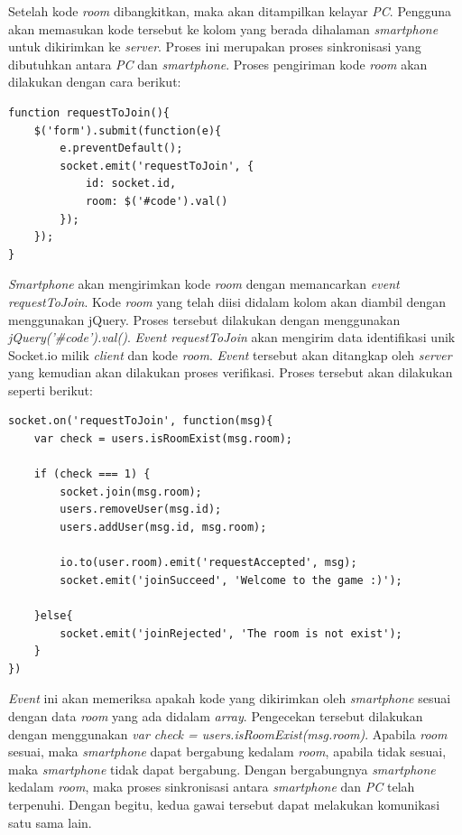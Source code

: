 \begin{enumerate}
\begin{itemize}
		Setelah kode \textit{room} dibangkitkan, maka akan ditampilkan kelayar \textit{PC}. Pengguna akan memasukan kode tersebut ke kolom yang berada dihalaman \textit{smartphone} untuk dikirimkan ke \textit{server}. Proses ini merupakan proses sinkronisasi yang dibutuhkan antara \textit{PC} dan \textit{smartphone}. Proses pengiriman kode \textit{room} akan dilakukan dengan cara berikut:
\begin{lstlisting}[caption={Proses permintaan bergabung pada \textit{client}}, label={lst:client_req}, captionpos=b]
function requestToJoin(){
	$('form').submit(function(e){
		e.preventDefault();
		socket.emit('requestToJoin', {
			id: socket.id,
			room: $('#code').val()
		});
	});
}
\end{lstlisting}
		\textit{Smartphone} akan mengirimkan kode \textit{room} dengan memancarkan \textit{event requestToJoin}. Kode \textit{room} yang telah diisi didalam kolom akan diambil dengan menggunakan jQuery. Proses tersebut dilakukan dengan menggunakan \textit{jQuery('\#code').val()}. \textit{Event requestToJoin} akan mengirim data identifikasi unik Socket.io milik \textit{client} dan kode \textit{room}. \textit{Event} tersebut akan ditangkap oleh \textit{server} yang kemudian akan dilakukan proses verifikasi. Proses tersebut akan dilakukan seperti berikut:
\begin{lstlisting}[caption={Proses verifikasi}, label={lst:prosesVerifikasi},captionpos=b]
socket.on('requestToJoin', function(msg){
	var check = users.isRoomExist(msg.room);

	if (check === 1) {
		socket.join(msg.room);
		users.removeUser(msg.id);
		users.addUser(msg.id, msg.room);

		io.to(user.room).emit('requestAccepted', msg);
		socket.emit('joinSucceed', 'Welcome to the game :)');

	}else{
		socket.emit('joinRejected', 'The room is not exist');
	}
})
\end{lstlisting}
		\textit{Event} ini akan memeriksa apakah kode yang dikirimkan oleh \textit{smartphone} sesuai dengan data \textit{room} yang ada didalam \textit{array}. Pengecekan tersebut dilakukan dengan menggunakan \textit{var check = users.isRoomExist(msg.room)}. Apabila \textit{room} sesuai, maka \textit{smartphone} dapat bergabung kedalam \textit{room}, apabila tidak sesuai, maka \textit{smartphone} tidak dapat bergabung. Dengan bergabungnya \textit{smartphone} kedalam \textit{room}, maka proses sinkronisasi antara \textit{smartphone} dan \textit{PC} telah terpenuhi. Dengan begitu, kedua gawai tersebut dapat melakukan komunikasi satu sama lain.
		
	\end{itemize}
\end{enumerate}
